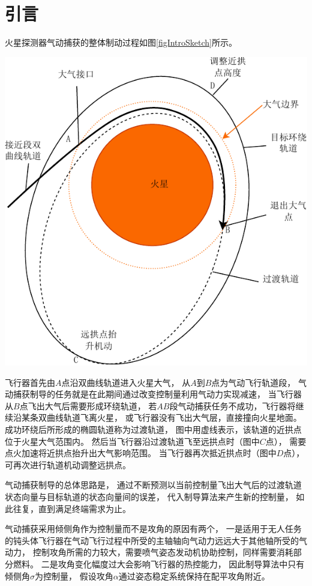 \section{引\quad 言}
火星探测器气动捕获的整体制动过程如图\ref{figIntroSketch}所示。
\begin{center}
	\includegraphics[scale=0.8]{IntroSketch.pdf}  \\
	 \label{figIntroSketch}
\end{center}

飞行器首先由$A$点沿双曲线轨道进入火星大气，
从$A$到$B$点为气动飞行轨道段，
气动捕获制导的任务就是在此期间通过改变控制量利用气动力实现减速，
当飞行器从$B$点飞出大气后需要形成环绕轨道，
若$AB$段气动捕获任务不成功，飞行器将继续沿某条双曲线轨道飞离火星，
或飞行器没有飞出大气层，直接撞向火星地面。
成功环绕后所形成的椭圆轨道称为过渡轨道，
图中用虚线表示，该轨道的近拱点位于火星大气范围内。
然后当飞行器沿过渡轨道飞至远拱点时（图中$C$点），
需要点火加速将近拱点抬升出大气影响范围。
当飞行器再次抵近拱点时（图中$D$点），
可再次进行轨道机动调整远拱点。\cite{dqingyuan2019}

气动捕获制导的总体思路是，
通过不断预测以当前控制量飞出大气后的过渡轨道状态向量与目标轨道的状态向量间的误差，
代入制导算法来产生新的控制量，
如此往复，直到满足终端需求为止\cite{dqingyuan2019}。

气动捕获采用倾侧角作为控制量而不是攻角的原因有两个，
一是适用于无人任务的钝头体飞行器在气动飞行过程中所受的主轴轴向气动力远远大于其他轴所受的气动力，
控制攻角所需的力较大，需要喷气姿态发动机协助控制，同样需要消耗部分燃料。
二是攻角变化幅度过大会影响飞行器的热控能力，
因此制导算法中只有倾侧角$\sigma$为控制量，
假设攻角$\alpha$通过姿态稳定系统保持在配平攻角附近。
